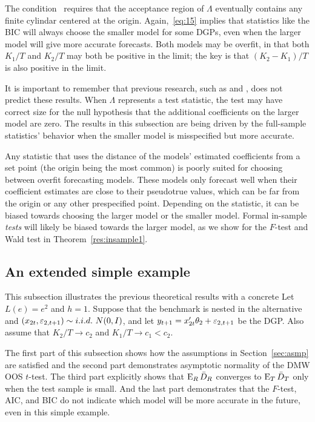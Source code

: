 \documentclass[12pt]{article}
\begin{document}
The condition~\label{eq:27} requires that the acceptance region of
$\Lambda$ eventually contains any finite cylindar centered at the
origin. Again,~\eqref{eq:15} implies that statistics like the BIC
will always choose the smaller model for some DGPs, even when the
larger model will give more accurate forecasts. Both models may be
overfit, in that both $K_1/T$ and $K_2/T$ may both be positive in the
limit; the key is that $(K_2 - K_1)/T$ is also positive in the limit.

It is important to remember that previous research, such as
\citet{Cal:11c} and \citet{Ana:12}, does not predict these
results. When $\Lambda$ represents a test statistic, the test may have
correct size for the null hypothesis that the additional coefficients
on the larger model are zero. The results in this subsection are being
driven by the full-sample statistics' behavior when the smaller model
is misspecified but more accurate.

Any statistic that uses the distance of the models' estimated
coefficients from a set point (the origin being the most common) is
poorly suited for choosing between overfit forecasting models. These
models only forecast well when their coefficient estimates are close
to their pseudotrue values, which can be far from the origin or any
other prespecified
point. Depending on the statistic, it can be biased towards choosing
the larger model or the smaller model. Formal in-sample \emph{tests}
will likely be biased towards the larger model, as we show for the
$F$-test and Wald test in Theorem~\ref{res:insample1}.

\subsection{An extended simple example}
\label{sec:example}

This subsection illustrates the previous theoretical results with a
concrete Let $L(e) = e^2$ and $h = 1$. Suppose that the benchmark is
nested in the alternative and $(x_{2t}, \varepsilon_{2,t+1}) \sim i.i.d.\
N(0,I)$, and let $y_{t+1} = x_{2t}'\theta_2 + \varepsilon_{2,t+1}$
be the DGP. Also assume that $K_2/T \to c_2$ and $K_1 / T \to c_1 <
c_2$.

The first part of this subsection shows how the assumptions in
Section~\ref{sec:asmp} are satisfied and the second part
demonstrates asymptotic normality of the DMW OOS $t$-test. The third
part explicitly shows that $\operatorname{E}_R \bar{D}_{R}$ converges to $\operatorname{E}_T \bar{D}_{T}$ only
when the test sample is small. And the last part demonstrates that the
$F$-test, AIC, and BIC do not indicate which model will be more
accurate in the future, even in this simple example.
\end{document}

